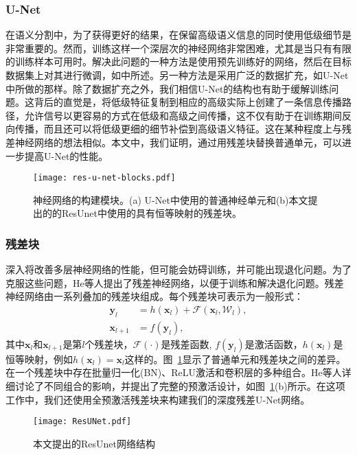 \begin{translation}
\subsubsection{U-Net}
在语义分割中，为了获得更好的结果，在保留高级语义信息的同时使用低级细节是非常重要的\cite{23,24}。然而，训练这样一个深层次的神经网络非常困难，尤其是当只有有限的训练样本可用时。解决此问题的一种方法是使用预先训练好的网络，然后在目标数据集上对其进行微调，如\cite{23}中所述。另一种方法是采用广泛的数据扩充，如U-Net中所做的那样\cite{24}。除了数据扩充之外，我们相信U-Net的结构也有助于缓解训练问题。这背后的直觉是，将低级特征复制到相应的高级实际上创建了一条信息传播路径，允许信号以更容易的方式在低级和高级之间传播，这不仅有助于在训练期间反向传播，而且还可以将低级更细的细节补偿到高级语义特征。这在某种程度上与残差神经网络的想法相似\cite{21}。本文中，我们证明，通过用残差块替换普通单元，可以进一步提高U-Net的性能。
\begin{figure}[t!]
	\begin{center}
		\texttt{[image: res-u-net-blocks.pdf]}
		\caption{神经网络的构建模块。(a) U-Net中使用的普通神经单元和(b)本文提出的的ResUnet中使用的具有恒等映射的残差块。}
		\label{Fig:ResNet Block}
	\end{center}
\end{figure}
\subsubsection{残差块}
深入将改善多层神经网络的性能，但可能会妨碍训练，并可能出现退化问题\cite{21}。为了克服这些问题，He等人\cite{21}提出了残差神经网络，以便于训练和解决退化问题。残差神经网络由一系列叠加的残差块组成。每个残差块可表示为一般形式：
\begin{equation}\label{Equ:Residual Uint}
  \begin{split}
  \mathbf{y}_{l}\ \ \ & = h(\mathbf{x}_{l})+\mathcal{F}(\mathbf{x}_{l}, \mathcal{W}_{l}), \\
  \mathbf{x}_{l+1} & = f(\mathbf{y}_{l}),
  \end{split}
\end{equation}
其中$\mathbf{x}_{l}$和$\mathbf{x}_{l+1}$是第$l$个残差块，$\mathcal{F}(\cdot)$是残差函数, $f(\mathbf{y}_l)$是激活函数，$h(\mathbf{x}_{l})$是恒等映射，例如$h(\mathbf{x}_{l}) = \mathbf{x}_{l}$这样的。图~\ref{Fig:ResNet Block}显示了普通单元和残差块之间的差异。在一个残差块中存在批量归一化(BN)、ReLU激活和卷积层的多种组合。He等人\cite{22}详细讨论了不同组合的影响，并提出了完整的预激活设计，如图~\ref{Fig:ResNet Block}(b)所示。在这项工作中，我们还使用全预激活残差块来构建我们的深度残差U-Net网络。
\begin{figure}[tbp!]
	\begin{center}
		\texttt{[image: ResUNet.pdf]}
		\caption{本文提出的ResUnet网络结构}
		\label{Fig:Deep Res-U-Net}
	\end{center}
\end{figure}


\end{translation}
